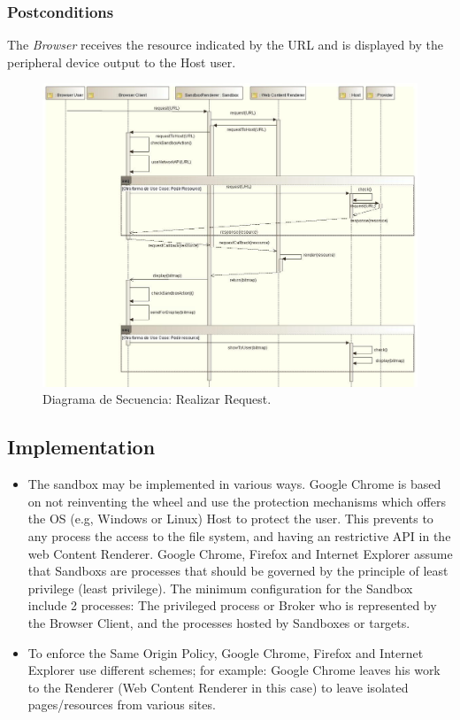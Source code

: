 \documentclass{sig-alternate-05-2015}
\begin{document}
    \subsubsection*{Postconditions} The \textit{Browser} receives the resource indicated by the URL and is displayed by the peripheral device output to the Host user.
      \begin{figure}[h!t]
          \centering
          \includegraphics[scale=0.61]{figures/requestResource_v2.jpg}
          \caption{Diagrama de Secuencia: Realizar Request.}
          \label{fig:SecReq}
      \end{figure}

  \subsection*{Implementation}
  \begin{itemize}
    \item The sandbox may be implemented in various ways. Google Chrome \cite{sandboxGC} is based on not reinventing the wheel and use the protection mechanisms which offers the OS (e.g, Windows or Linux) Host to protect the user. This prevents to any process the access to the file system, and having an restrictive API in the web Content Renderer. Google Chrome, Firefox and Internet Explorer assume that Sandboxs are processes that should be governed by the principle of least privilege (least privilege). The minimum configuration for the Sandbox include 2 processes: The privileged process or Broker who is represented by the Browser Client, and the processes hosted by Sandboxes or targets.
    \item To enforce the Same Origin Policy, Google Chrome, Firefox and Internet Explorer use different schemes; for example: Google Chrome leaves his work to the Renderer (Web Content Renderer in this case) to leave isolated pages/resources from various sites.
  \end{itemize}
\end{document}
